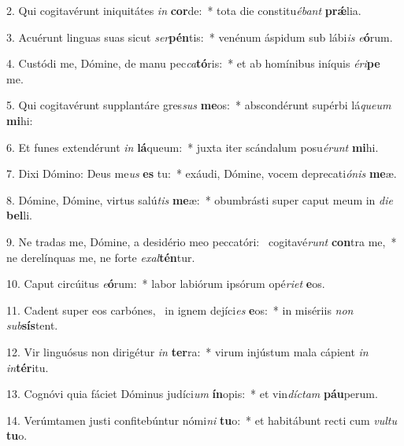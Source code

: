 2. Qui cogitavérunt iniquitátes \textit{in} \textbf{cor}de:~*  tota die constitu\textit{é}\textit{bant} \textbf{prǽ}lia.\

3. Acuérunt linguas suas sicut \textit{ser}\textbf{pén}tis:~*  venénum áspidum sub lábi\textit{is} \textit{e}\textbf{ó}rum.\

4. Custódi me, Dómine, de manu pec\textit{ca}\textbf{tó}ris:~*  et ab homínibus iníquis \textit{é}\textit{ri}\textbf{pe} me.\

5. Qui cogitavérunt supplantáre gres\textit{sus} \textbf{me}os:~*  abscondérunt supérbi lá\textit{que}\textit{um} \textbf{mi}hi:\

6. Et funes extendérunt \textit{in} \textbf{lá}queum:~*  juxta iter scándalum posu\textit{é}\textit{runt} \textbf{mi}hi.\

7. Dixi Dómino: Deus me\textit{us} \textbf{es} tu:~*  exáudi, Dómine, vocem deprecati\textit{ó}\textit{nis} \textbf{me}æ.\

8. Dómine, Dómine, virtus salú\textit{tis} \textbf{me}æ:~*  obumbrásti super caput meum in \textit{di}\textit{e} \textbf{bel}li.\

9. Ne tradas me, Dómine, a desidério meo peccatóri: \dag\  cogitavé\textit{runt} \textbf{con}tra me,~*  ne derelínquas me, ne forte \textit{ex}\textit{al}\textbf{tén}tur.\

10. Caput circúitus \textit{e}\textbf{ó}rum:~*  labor labiórum ipsórum opé\textit{ri}\textit{et} \textbf{e}os.\

11. Cadent super eos carbónes, \dag\  in ignem dejíci\textit{es} \textbf{e}os:~*  in misériis \textit{non} \textit{sub}\textbf{sís}tent.\

12. Vir linguósus non dirigétur \textit{in} \textbf{ter}ra:~*  virum injústum mala cápient \textit{in} \textit{in}\textbf{tér}itu.\

13. Cognóvi quia fáciet Dóminus judíci\textit{um} \textbf{ín}opis:~*  et vin\textit{díc}\textit{tam} \textbf{páu}perum.\

14. Verúmtamen justi confitebúntur nómi\textit{ni} \textbf{tu}o:~*  et habitábunt recti cum \textit{vul}\textit{tu} \textbf{tu}o.\

